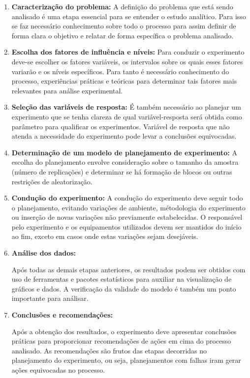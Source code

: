 \begin{enumerate}
    \item \textbf{Caracterização do problema:}
    A definição do problema que está sendo analisado é uma etapa essencial para se entender o estudo analítico. Para isso se faz necessário conhecimento sobre todo o processo para assim definir de forma clara o objetivo e relatar de forma específica o problema analisado.

    \item \textbf{Escolha dos fatores de influência e níveis:}
    Para conduzir o experimento deve-se escolher os fatores variáveis, os intervalos sobre os quais esses fatores variarão e os níveis específicos. Para tanto é necessário conhecimento do processo, experiências práticas e teóricas para determinar tais fatores mais relevantes para análise experimental.
    \item \textbf{Seleção das variáveis de resposta:}
    É também necessário ao planejar um experimento que se tenha clareza de qual variável-resposta será obtida como parâmetro para qualificar os experimentos. Variável de resposta que não atenda a necessidade do experimento pode levar a conclusões equivocadas. 
    \item \textbf{Determinação de um modelo de planejamento de experimento:}
    A escolha do planejamento envolve consideração sobre o tamanho da amostra (número de replicações) e determinar se há formação de blocos ou outras restrições de aleatorização.
    \item \textbf{Condução do experimento:}
    A condução do experimento deve seguir todo o planejamento, evitando variações de ambiente, métodologia do experimento ou inserção de novas variações não previamente estabelecidas. O responsável pelo experimento e os equipamentos utilizados devem ser mantidos do início ao fim, exceto em casos onde estas variações sejam desejáveis.

    \item \textbf{Análise dos dados:}
    
    Após todas as demais etapas anteriores, os resultados podem ser obtidos com uso de ferramentas e pacotes estatísticos para auxiliar na visualização de gráficos e dados. A verificação da validade do modelo é também um ponto importante para análisar. 

    \item \textbf{Conclusões e recomendações:}
    
    Após a obtenção dos resultados, o experimento deve apresentar conclusões práticas para proporcionar recomendações de ações em cima do processo analisado. As recomendações são frutos das etapas decorridas no planejamento do experimento, ou seja, planejamentos com falhas iram gerar ações equivocadas no processo. 
     
\end{enumerate}

